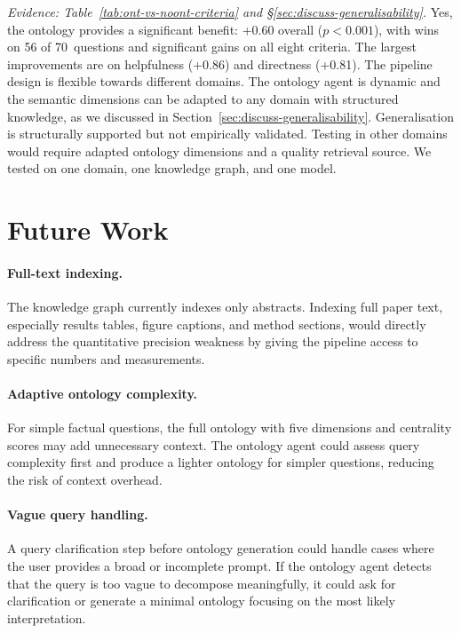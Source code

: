 \noindent\emph{Evidence: Table~\ref{tab:ont-vs-noont-criteria} and \S\ref{sec:discuss-generalisability}.}
Yes, the ontology provides a significant benefit: +0.60 overall ($p < 0.001$), with wins on 56 of 70~questions and significant gains on all eight criteria. The largest improvements are on helpfulness (+0.86) and directness (+0.81). The pipeline design is flexible towards different domains. The ontology agent is dynamic and the semantic dimensions can be adapted to any domain with structured knowledge, as we discussed in Section~\ref{sec:discuss-generalisability}. Generalisation is structurally supported but not empirically validated. Testing in other domains would require adapted ontology dimensions and a quality retrieval source. We tested on one domain, one knowledge graph, and one model.


\section{Future Work}
\label{sec:future-work}

\paragraph{Full-text indexing.} The knowledge graph currently indexes only abstracts. Indexing full paper text, especially results tables, figure captions, and method sections, would directly address the quantitative precision weakness by giving the pipeline access to specific numbers and measurements.

\paragraph{Adaptive ontology complexity.} For simple factual questions, the full ontology with five dimensions and centrality scores may add unnecessary context. The ontology agent could assess query complexity first and produce a lighter ontology for simpler questions, reducing the risk of context overhead.

\paragraph{Vague query handling.} A query clarification step before ontology generation could handle cases where the user provides a broad or incomplete prompt. If the ontology agent detects that the query is too vague to decompose meaningfully, it could ask for clarification or generate a minimal ontology focusing on the most likely interpretation.

